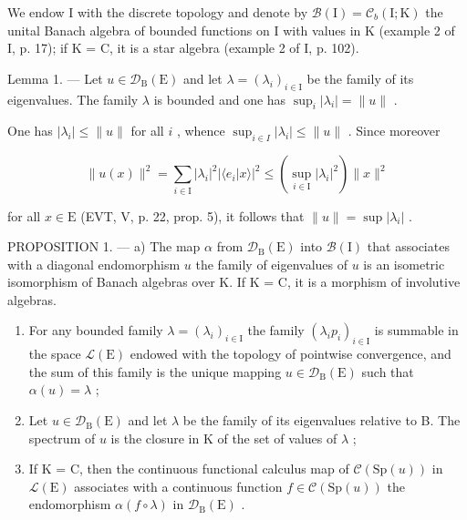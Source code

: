 We endow I with the discrete topology and denote by \(\mathcal{B}(\mathrm{I}) = \mathcal{C}_{b}(\mathrm{I}; \mathrm{K})\) the unital Banach algebra of bounded functions on I with values in K (example 2 of I, p. 17); if K = C, it is a star algebra (example 2 of I, p. 102).

Lemma 1. --- Let \(u \in \mathcal{D}_{\mathrm{B}}(\mathrm{E})\) and let \(\lambda = (\lambda_i)_{i \in \mathrm{I}}\) be the family of its eigenvalues. The family \(\lambda\) is bounded and one has \(\sup_i |\lambda_i| = \| u\|\) .

One has \(|\lambda_i| \leqslant \|u\|\) for all \(i\) , whence \(\sup_{i \in I} |\lambda_i| \leqslant \|u\|\) . Since moreover

\[
\| u (x) \| ^ {2} = \sum_ {i \in \mathrm{I}} | \lambda_ {i} | ^ {2} | \langle e _ {i} | x \rangle | ^ {2} \leqslant \left(\sup _ {i \in \mathrm{I}} | \lambda_ {i} | ^ {2}\right) \| x \| ^ {2}
\]

for all \(x \in \mathrm{E}\) (EVT, V, p. 22, prop. 5), it follows that \(\| u\| = \sup |\lambda_i|\) .

PROPOSITION 1. --- a) The map \(\alpha\) from \(\mathcal{D}_{\mathrm{B}}(\mathrm{E})\) into \(\mathcal{B}(\mathrm{I})\) that associates with a diagonal endomorphism \(u\) the family of eigenvalues of \(u\) is an isometric isomorphism of Banach algebras over K. If K = C, it is a morphism of involutive algebras.

\begin{enumerate}
\def\labelenumi{\alph{enumi})}
\setcounter{enumi}{1}
\item
  For any bounded family \(\lambda = (\lambda_i)_{i\in \mathrm{I}}\) the family \((\lambda_ip_i)_{i\in \mathrm{I}}\) is summable in the space \(\mathcal{L}(\mathrm{E})\) endowed with the topology of pointwise convergence, and the sum of this family is the unique mapping \(u\in \mathcal{D}_{\mathrm{B}}(\mathrm{E})\) such that \(\alpha (u) = \lambda\) ;
\item
  Let \(u \in \mathcal{D}_{\mathrm{B}}(\mathrm{E})\) and let \(\lambda\) be the family of its eigenvalues relative to B. The spectrum of \(u\) is the closure in K of the set of values of \(\lambda\) ;
\item
  If K = C, then the continuous functional calculus map of \(\mathcal{C}(\mathrm{Sp}(u))\) in \(\mathcal{L}(\mathrm{E})\) associates with a continuous function \(f \in \mathcal{C}(\mathrm{Sp}(u))\) the endomorphism \(\alpha(f \circ \lambda)\) in \(\mathcal{D}_{\mathrm{B}}(\mathrm{E})\) .
\end{enumerate}

